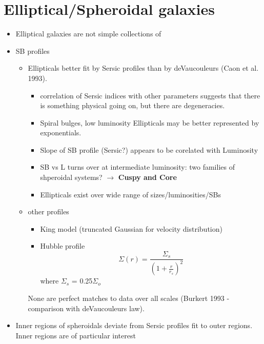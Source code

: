 \documentclass[12pt]{article}
\begin{document}
\section*{Elliptical/Spheroidal galaxies}
\begin{itemize}
    \item Elliptical galaxies are not simple collections of
    \item SB profiles
        \begin{itemize}
            \item Ellipticals better fit by Sersic profiles than by
                deVaucouleurs (Caon et al. 1993).
                \begin{itemize}
                    \item correlation of Sersic indices with other parameters
                      suggests that there is something physical going on, but there are degeneracies.
                    \item Spiral bulges, low luminosity Ellipticals may be better
                      represented by exponentials.
                    \item Slope of SB profile (Sersic?) appears to be corelated with
                      Luminosity
                    \item SB vs L turns over at intermediate luminosity: two
                      families of shperoidal systems? $\rightarrow$ \textbf{Cuspy and
                      Core}
                    \item Ellipticals exist over wide range of
                      sizes/luminosities/SBs
                \end{itemize}
            \item other profiles
                \begin{itemize}
                    \item King model (truncated Gaussian for velocity distribution)
                    \item Hubble profile
                        $$ \Sigma(r) = \frac{\Sigma_s}{(1+\frac{r}{r_s})^2} $$
                        where $\Sigma_s$ = 0.25$\Sigma_o$
                \end{itemize}
            None are perfect matches to data over all scales (Burkert 1993 -
            comparison with deVaucouleurs law).
        \end{itemize}
    \item Inner regions of spheroidals deviate from Sersic profiles
        fit to outer regions. Inner regions are of particular interest

\end{itemize}
\end{document}
